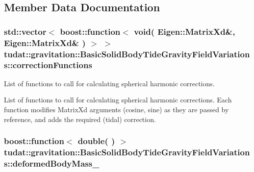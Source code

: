 \subsection{Member Data Documentation}
\subsubsection[{\texorpdfstring{correction\+Functions}{correctionFunctions}}]{\setlength{\rightskip}{0pt plus 5cm}std\+::vector$<$ boost\+::function$<$ void( Eigen\+::\+Matrix\+Xd\&, Eigen\+::\+Matrix\+Xd\& ) $>$ $>$ tudat\+::gravitation\+::\+Basic\+Solid\+Body\+Tide\+Gravity\+Field\+Variations\+::correction\+Functions\hspace{0.3cm}{\ttfamily [protected]}}\hypertarget{classtudat_1_1gravitation_1_1BasicSolidBodyTideGravityFieldVariations_aa875438d3e5e31a16b45c0009975954a}{}\label{classtudat_1_1gravitation_1_1BasicSolidBodyTideGravityFieldVariations_aa875438d3e5e31a16b45c0009975954a}


List of functions to call for calculating spherical harmonic corrections. 

List of functions to call for calculating spherical harmonic corrections. Each function modifies Matrix\+Xd arguments (cosine, sine) as they are passed by reference, and adds the required (tidal) correction. 
\subsubsection[{\texorpdfstring{deformed\+Body\+Mass\+\_\+}{deformedBodyMass_}}]{\setlength{\rightskip}{0pt plus 5cm}boost\+::function$<$ double( ) $>$ tudat\+::gravitation\+::\+Basic\+Solid\+Body\+Tide\+Gravity\+Field\+Variations\+::deformed\+Body\+Mass\+\_\+\hspace{0.3cm}{\ttfamily [protected]}}\hypertarget{classtudat_1_1gravitation_1_1BasicSolidBodyTideGravityFieldVariations_ab12ae5c98ab6a31a2bbff565f1dc157c}{}\label{classtudat_1_1gravitation_1_1BasicSolidBodyTideGravityFieldVariations_ab12ae5c98ab6a31a2bbff565f1dc157c}


